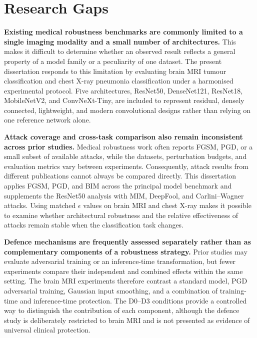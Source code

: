 \documentclass[12pt,a4paper,oneside]{report}
\begin{document}
\section{Research Gaps}
\label{sec:rw-gaps}


\textbf{Existing medical robustness benchmarks are commonly limited to a single imaging modality and a small number of architectures.} This makes it difficult to determine whether an observed result reflects a general property of a model family or a peculiarity of one dataset. The present dissertation responds to this limitation by evaluating brain MRI tumour classification and chest X-ray pneumonia classification under a harmonised experimental protocol. Five architectures, ResNet50, DenseNet121, ResNet18, MobileNetV2, and ConvNeXt-Tiny, are included to represent residual, densely connected, lightweight, and modern convolutional designs rather than relying on one reference network alone.

\textbf{Attack coverage and cross-task comparison also remain inconsistent across prior studies.} Medical robustness work often reports FGSM, PGD, or a small subset of available attacks, while the datasets, perturbation budgets, and evaluation metrics vary between experiments. Consequently, attack results from different publications cannot always be compared directly. This dissertation applies FGSM, PGD, and BIM across the principal model benchmark and supplements the ResNet50 analysis with MIM, DeepFool, and Carlini--Wagner attacks. Using matched $\epsilon$ values on brain MRI and chest X-ray makes it possible to examine whether architectural robustness and the relative effectiveness of attacks remain stable when the classification task changes.

\textbf{Defence mechanisms are frequently assessed separately rather than as complementary components of a robustness strategy.} Prior studies may evaluate adversarial training or an inference-time transformation, but fewer experiments compare their independent and combined effects within the same setting. The brain MRI experiments therefore contrast a standard model, PGD adversarial training, Gaussian input smoothing, and a combination of training-time and inference-time protection. The D0--D3 conditions provide a controlled way to distinguish the contribution of each component, although the defence study is deliberately restricted to brain MRI and is not presented as evidence of universal clinical protection.
\end{document}
